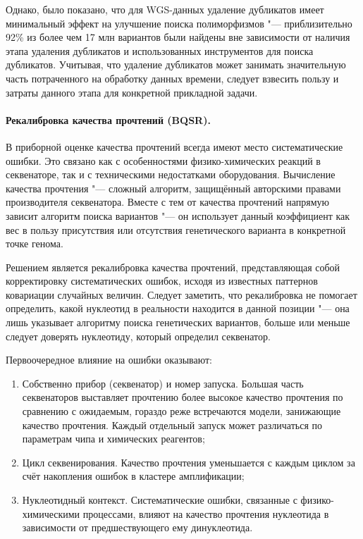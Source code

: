 \documentclass[a4paper,12pt]{article}
\begin{document}
Однако, было показано, что для WGS-данных удаление дубликатов имеет минимальный эффект на улучшение поиска полиморфизмов "--- приблизительно 92\% из более чем 17 млн вариантов были найдены вне зависимости от наличия этапа удаления дубликатов и использованных инструментов для поиска дубликатов\cite{ebbert}.
Учитывая, что удаление дубликатов может занимать значительную часть потраченного на обработку данных времени, следует взвесить пользу и затраты данного этапа для конкретной прикладной задачи.

\paragraph{Рекалибровка качества прочтений (BQSR).}
В приборной оценке качества прочтений всегда имеют место систематические ошибки.
Это связано как с особенностями физико-химических реакций в секвенаторе, так и с техническими недостатками оборудования.
Вычисление качества прочтения "--- сложный алгоритм, защищённый авторскими правами производителя секвенатора.
Вместе с тем от качества прочтений напрямую зависит алгоритм поиска вариантов "--- он использует данный коэффициент как вес в пользу присутствия или отсутствия генетического варианта в конкретной точке генома.

Решением является рекалибровка качества прочтений, представляющая собой корректировку систематических ошибок, исходя из известных паттернов ковариации случайных величин.
Следует заметить, что рекалибровка не помогает определить, какой нуклеотид в реальности находится в данной позиции "--- она лишь указывает алгоритму поиска генетических вариантов, больше или меньше следует доверять нуклеотиду, который определил секвенатор.

Первоочередное влияние на ошибки оказывают:

\begin{enumerate}
\item Собственно прибор (секвенатор) и номер запуска.
Большая часть секвенаторов выставляет прочтению более высокое качество прочтения по сравнению с ожидаемым, гораздо реже встречаются модели, занижающие качество прочтения\cite{gatk}.
Каждый отдельный запуск может различаться по параметрам чипа и химических реагентов;
\item Цикл секвенирования.
Качество прочтения уменьшается с каждым циклом за счёт накопления ошибок в кластере амплификации;
\item Нуклеотидный контекст.
Систематические ошибки, связанные с физико-химическими процессами, влияют на качество прочтения нуклеотида в зависимости от предшествующего ему динуклеотида.
\end{enumerate}
\end{document}
